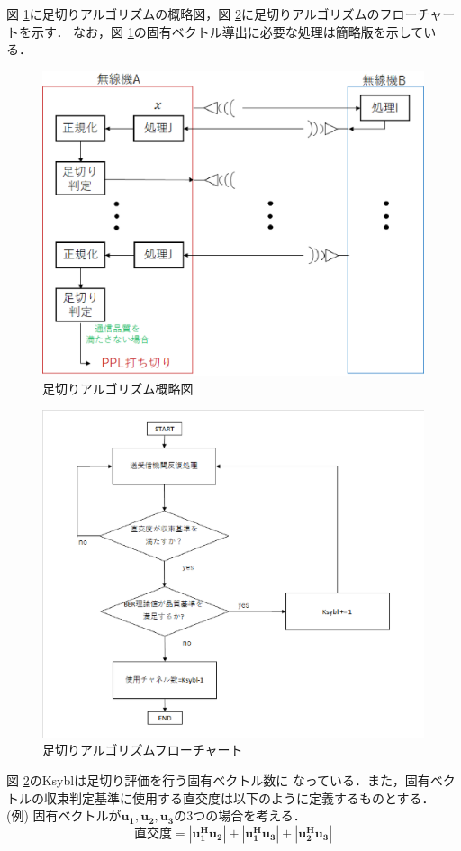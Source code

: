 図 \ref{figCutoff}に足切りアルゴリズムの概略図，図 \ref{figCutoffFlow}に足切りアルゴリズムのフローチャートを示す．
なお，図 \ref{figCutoff}の固有ベクトル導出に必要な処理は簡略版を示している．
\begin{figure}
    \centering
    \includegraphics[width=\linewidth]{chapter4/figure/Cutoff.eps}
    \caption{足切りアルゴリズム概略図}
    \label{figCutoff}
\end{figure}
\begin{figure}
    \centering
    \includegraphics[width=0.95\linewidth]{chapter4/figure/CutoffFlow.eps}
    \caption{足切りアルゴリズムフローチャート}
    \label{figCutoffFlow}
\end{figure}
図 \ref{figCutoffFlow}のKsyblは足切り評価を行う固有ベクトル数に
なっている．また，固有ベクトルの収束判定基準に使用する直交度は以下のように定義するものとする．\\
\vspace{5mm}
(例) \quad 固有ベクトルが$\bm{u_1,u_2,u_3}$の3つの場合を考える．
\begin{equation}
    直交度 = \left|\bm{u_1^Hu_2}\right|+\left|\bm{u_1^Hu_3}\right|+\left|\bm{u_2^Hu_3}\right|
\end{equation}

